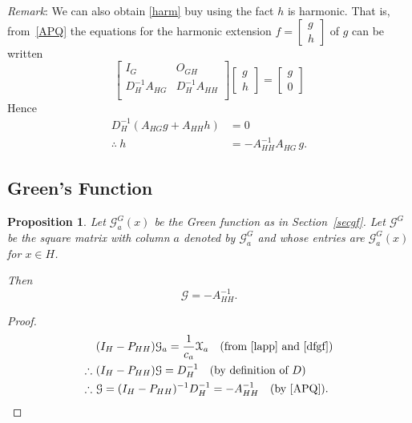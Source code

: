 \documentclass[a4paper]{amsart}
\theoremstyle{plain}
\newtheorem{proposition}[theorem]{Proposition}
\theoremstyle{definition}
\theoremstyle{remark}
\begin{document}
 \medskip
\emph{Remark}:  We can also obtain \eqref{harm} buy using the fact $ h $ is harmonic.  
That is, from~\eqref{APQ} the equations for the harmonic extension $ f = \begin{bmatrix}  g\\  h    \end{bmatrix} $ of $ g $ can be written
\[
\begin{bmatrix} %
      I_G & O_{GH} \\
      D_H^{-1} A_{HG} & D_H^{-1} A_{HH} \\
   \end{bmatrix} 
   \begin{bmatrix} g\\ h \end{bmatrix}
   =    \begin{bmatrix} g\\ 0 \end{bmatrix}
\]
Hence 
\begin{align*}
  D_H^{-1} (A_{HG} g + A_{HH} h ) &= 0\\
\therefore\ h &= -A_{HH}^{-1} A_{HG}\, g.
\end{align*} 

\subsection{Green's Function}  
\begin{proposition}
Let  $  \mathcal{G}^G_a(x) $  be the Green function as in Section~\ref{secgf}.  Let   $  \mathcal{G}^G $ be the square matrix with column $ a $ denoted by  $     \mathcal{G}^G_a $  and whose entries are $   \mathcal{G}^G_a(x) $ 
for $ x \in H $.

Then 
\begin{equation} \label{matG}
\boxed{ \mathcal{G}  = -A_{HH}^{-1}. }
\end{equation}
\end{proposition}

\begin{proof} 
 \begin{align*}
   &(I_{H} -P_{HH} ) \mathcal{G}_a  = \dfrac{1}{c_a} \mathcal{X}_a  \quad 
                      \text{(from \eqref{lapp} and \eqref{dfgf})}  \\
\therefore\ &(I_H -P_{HH}) \mathcal{G}  = D_H^{-1}  \quad \text{(by definition of $D  $)}\\
\therefore\ &\mathcal{G}   = (I_H - P_{HH})^{-1} D_H^{-1} = -A_{HH}^{-1}    \quad \text{(by \eqref{APQ})}.
\qedhere
\end{align*}
\end{proof} 
\end{document}
